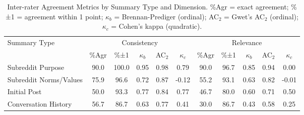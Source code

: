 \begin{table}[htbp]
\centering
\small
\begin{tabular}{l|ccccc|ccccc}
\hline
\multirow{2}{*}{Summary Type} & \multicolumn{5}{c|}{Consistency} & \multicolumn{5}{c}{Relevance} \\
\cline{2-11}
& \%Agr & \%±1 & $\kappa_b$ & AC$_2$ & $\kappa_c$ & \%Agr & \%±1 & $\kappa_b$ & AC$_2$ & $\kappa_c$ \\
\hline
Subreddit Purpose & 90.0 & 100.0 & 0.95 & 0.98 & 0.79 & 90.0 & 96.7 & 0.85 & 0.94 & 0.00 \\
Subreddit Norms/Values & 75.9 & 96.6 & 0.72 & 0.87 & -0.12 & 55.2 & 93.1 & 0.63 & 0.82 & -0.01 \\
Initial Post & 50.0 & 93.3 & 0.77 & 0.84 & 0.77 & 46.7 & 80.0 & 0.60 & 0.71 & 0.50 \\
Conversation History & 56.7 & 86.7 & 0.63 & 0.77 & 0.41 & 30.0 & 86.7 & 0.43 & 0.58 & 0.25 \\
\hline
\end{tabular}
\caption{Inter-rater Agreement Metrics by Summary Type and Dimension. \%Agr = exact agreement; \%±1 = agreement within 1 point; $\kappa_b$ = Brennan-Prediger (ordinal); AC$_2$ = Gwet's AC$_2$ (ordinal); $\kappa_c$ = Cohen's kappa (quadratic).}
\label{tab:context_summarization_iaa}
\end{table}